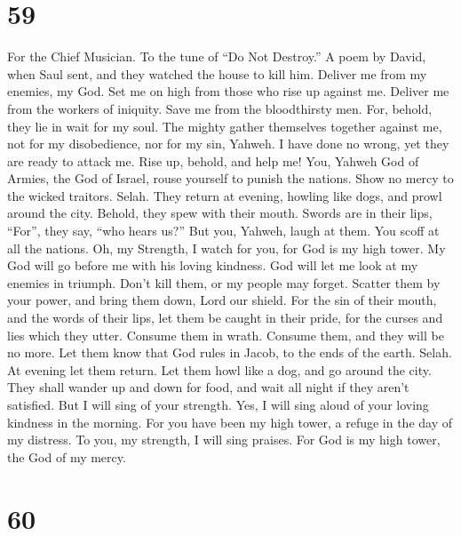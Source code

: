 \hypertarget{section-58}{%
\section{59}\label{section-58}}

For the Chief Musician. To the tune of ``Do Not Destroy.'' A poem by
David, when Saul sent, and they watched the house to kill him.
 Deliver me from my enemies, my God. Set me on high from
those who rise up against me.  Deliver me from the workers
of iniquity. Save me from the bloodthirsty men.  For,
behold, they lie in wait for my soul. The mighty gather themselves
together against me, not for my disobedience, nor for my sin, Yahweh.
 I have done no wrong, yet they are ready to attack me.
Rise up, behold, and help me!  You, Yahweh God of Armies,
the God of Israel, rouse yourself to punish the nations. Show no mercy
to the wicked traitors. Selah.  They return at evening,
howling like dogs, and prowl around the city.  Behold,
they spew with their mouth. Swords are in their lips, ``For'', they say,
``who hears us?''  But you, Yahweh, laugh at them. You
scoff at all the nations.  Oh, my Strength, I watch for
you, for God is my high tower.  My God will go before me
with his loving kindness. God will let me look at my enemies in triumph.
 Don't kill them, or my people may forget. Scatter them
by your power, and bring them down, Lord our shield.  For
the sin of their mouth, and the words of their lips, let them be caught
in their pride, for the curses and lies which they utter.
 Consume them in wrath. Consume them, and they will be no
more. Let them know that God rules in Jacob, to the ends of the earth.
Selah.  At evening let them return. Let them howl like a
dog, and go around the city.  They shall wander up and
down for food, and wait all night if they aren't satisfied.
 But I will sing of your strength. Yes, I will sing aloud
of your loving kindness in the morning. For you have been my high tower,
a refuge in the day of my distress.  To you, my strength,
I will sing praises. For God is my high tower, the God of my mercy.

\hypertarget{section-59}{%
\section{60}\label{section-59}}

